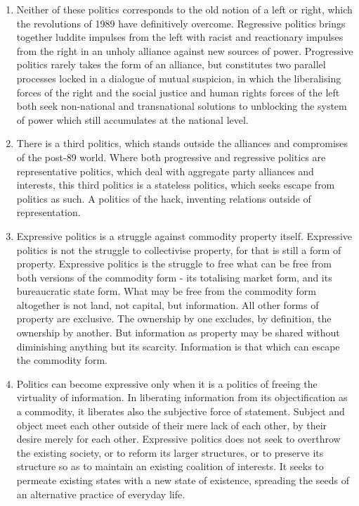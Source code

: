 \documentclass[letterpaper,12pt,english]{sphinxmanual}
\begin{document}
\begin{enumerate}
\item {} 
Neither of these politics corresponds to the old notion of a left or right, which the revolutions of 1989 have definitively overcome. Regressive politics brings together luddite impulses from the left with racist and reactionary impulses from the right in an unholy alliance against new sources of power. Progressive politics rarely takes the form of an alliance, but constitutes two parallel processes locked in a dialogue of mutual suspicion, in which the liberalising forces of the right and the social justice and human rights forces of the left both seek non-national and transnational solutions to unblocking the system of power which still accumulates at the national level.

\item {} 
There is a third politics, which stands outside the alliances and compromises of the post-89 world. Where both progressive and regressive politics are representative politics, which deal with aggregate party alliances and interests, this third politics is a stateless politics, which seeks escape from politics as such. A politics of the hack, inventing relations outside of representation.

\item {} 
Expressive politics is a struggle against commodity property itself. Expressive politics is not the struggle to collectivise property, for that is still a form of property. Expressive politics is the struggle to free what can be free from both versions of the commodity form - its totalising market form, and its bureaucratic state form. What may be free from the commodity form altogether is not land, not capital, but information. All other forms of property are exclusive. The ownership by one excludes, by definition, the ownership by another. But information as property may be shared without diminishing anything but its scarcity. Information is that which can escape the commodity form.

\item {} 
Politics can become expressive only when it is a politics of freeing the virtuality of information. In liberating information from its objectification as a commodity, it liberates also the subjective force of statement. Subject and object meet each other outside of their mere lack of each other, by their desire merely for each other. Expressive politics does not seek to overthrow the existing society, or to reform its larger structures, or to preserve its structure so as to maintain an existing coalition of interests. It seeks to permeate existing states with a new state of existence, spreading the seeds of an alternative practice of everyday life.

\end{enumerate}
\end{document}
